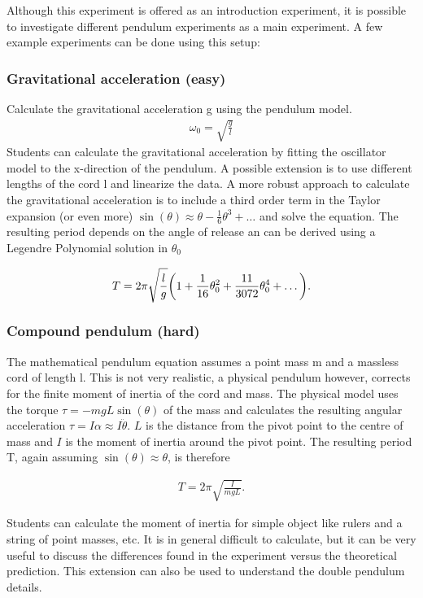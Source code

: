 \documentclass{article}
\begin{document}
Although this experiment is offered as an introduction experiment, it is possible to investigate different pendulum experiments as a main experiment. A few example experiments can be done using this setup:

\subsubsection{Gravitational acceleration (easy)}
Calculate the gravitational acceleration g using the pendulum model. 
\begin{align}
    \omega_0 =\sqrt{\frac{g}{l}}
\end{align}
Students can calculate the gravitational acceleration by fitting the oscillator model to the x-direction of the pendulum. A possible extension is to use different lengths of the cord l and linearize the data. A more robust approach to calculate the gravitational acceleration is to include a third order term in the Taylor expansion (or even more) $\sin(\theta)\approx\theta - \frac{1}{6}\theta^3 +\dots$ and solve the equation. The resulting period depends on the angle of release an can be derived using a Legendre Polynomial solution in $\theta_0$

\begin{align}
    T = 2\pi \sqrt{\frac{l}{g}}\bigg{(}1+\frac{1}{16}\theta_0^2 + \frac{11}{3072}\theta_0^4 + \dots\bigg{)}.
\end{align}

\subsubsection{Compound pendulum (hard)}
The mathematical pendulum equation
assumes a point mass m and a massless cord of length l. This is not very realistic, a physical pendulum however, corrects for the finite moment of inertia of the cord and mass. The physical model uses the torque $\tau = -mgL\sin(\theta)$ of the mass and calculates the resulting angular acceleration $\tau =I\alpha \approx I\ddot{\theta}$. $L$ is the distance from the pivot point to the centre of mass and $I$ is the moment of inertia around the pivot point. The resulting period T, again assuming $\sin(\theta)\approx\theta$, is therefore

\begin{align}
    T = 2\pi\sqrt{\frac{I}{mgL}}.
\end{align}

Students can calculate the moment of inertia for simple object like rulers and a string of point masses, etc. It is in general difficult to calculate, but it can be very useful to discuss the differences found in the experiment versus the theoretical prediction. This extension can also be used to understand the double pendulum details.
\end{document}
